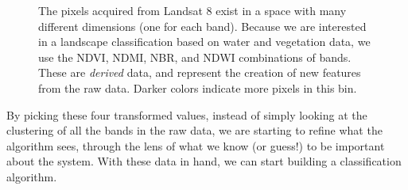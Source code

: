 \documentclass[
  letterpaper,
]{scrbook}
\begin{document}
\begin{figure}[pbt]


\caption{\label{fig-kmeans-hexbin}The pixels acquired from Landsat 8
exist in a space with many different dimensions (one for each band).
Because we are interested in a landscape classification based on water
and vegetation data, we use the NDVI, NDMI, NBR, and NDWI combinations
of bands. These are \emph{derived} data, and represent the creation of
new features from the raw data. Darker colors indicate more pixels in
this bin.}

\end{figure}%

By picking these four transformed values, instead of simply looking at
the clustering of all the bands in the raw data, we are starting to
refine what the algorithm sees, through the lens of what we know (or
guess!) to be important about the system. With these data in hand, we
can start building a classification algorithm.
\end{document}
